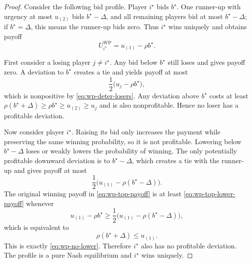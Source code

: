 \documentclass[11pt]{article}
\begin{document}
\begin{proof}
Consider the following bid profile. Player $i^\star$ bids $b^\star$. One runner-up with urgency at most $u_{(2)}$ bids
$b^\star-\Delta$, and all remaining players bid at most $b^\star-\Delta$; if $b^\star=\Delta$, this means the
runner-up bids zero. Thus $i^\star$ wins uniquely and obtains payoff
\begin{equation}
  U_{i^\star}^{\mathrm{WP}}
  =
  u_{(1)}-\rho b^\star.
  \label{eq:wp-top-payoff}
\end{equation}

First consider a losing player $j\ne i^\star$. Any bid below $b^\star$ still loses and gives payoff zero. A deviation
to $b^\star$ creates a tie and yields payoff at most
\begin{equation}
  \frac{1}{2}\bigl(u_j-\rho b^\star\bigr),
  \label{eq:wp-loser-tie-payoff}
\end{equation}
which is nonpositive by \eqref{eq:wp-deter-losers}. Any deviation above $b^\star$ costs at least
$\rho(b^\star+\Delta)\ge \rho b^\star\ge u_{(2)}\ge u_j$ and is also nonprofitable. Hence no loser has a profitable
deviation.

Now consider player $i^\star$. Raising its bid only increases the payment while preserving the same winning
probability, so it is not profitable. Lowering below $b^\star-\Delta$ loses or weakly lowers the probability of
winning. The only potentially profitable downward deviation is to $b^\star-\Delta$, which creates a tie with the
runner-up and gives payoff at most
\begin{equation}
  \frac{1}{2}\bigl(u_{(1)}-\rho(b^\star-\Delta)\bigr).
  \label{eq:wp-top-lower-payoff}
\end{equation}
The original winning payoff in \eqref{eq:wp-top-payoff} is at least \eqref{eq:wp-top-lower-payoff} whenever
\begin{equation}
  u_{(1)}-\rho b^\star
  \ge
  \frac{1}{2}\bigl(u_{(1)}-\rho(b^\star-\Delta)\bigr),
  \label{eq:wp-no-lower-derive}
\end{equation}
which is equivalent to
\begin{equation}
  \rho(b^\star+\Delta)\le u_{(1)}.
  \label{eq:wp-no-lower-equivalent}
\end{equation}
This is exactly \eqref{eq:wp-no-lower}. Therefore $i^\star$ also has no profitable deviation. The profile is a pure
Nash equilibrium and $i^\star$ wins uniquely.
\end{proof}
\end{document}

